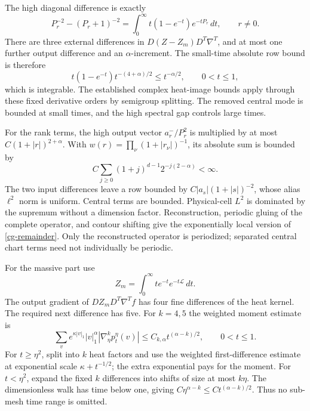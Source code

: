 The high diagonal difference is exactly
\begin{equation}\label{cg-high-remainder}
 P_r^{-2}-(P_r+1)^{-2}
 =\int_0^\infty t(1-e^{-t})e^{-tP_r}\,dt,
 \qquad r\ne0.
\end{equation}
There are three external differences in
$D(Z-Z_m)D^T\nabla^T$, and at most one further output
difference and an $\alpha$-increment. The small-time absolute
row bound is therefore
\begin{equation}\label{cg-time-budget}
 t(1-e^{-t})t^{-(4+\alpha)/2}\le t^{-\alpha/2},
 \qquad 0<t\le1,
\end{equation}
which is integrable. The established complex heat-image bounds
apply through these fixed derivative orders by semigroup
splitting. The removed central mode is bounded at small times,
and the high spectral gap controls large times.

For the rank terms, the high output vector $a_r^-/P_r^2$ is
multiplied by at most $C(1+|r|)^{2+\alpha}$.
With $w(r)=\prod_\nu(1+|r_\nu|)^{-1}$, its absolute sum is
bounded by
\[
 C\sum_{j\ge0}(1+j)^{d-1}2^{-j(2-\alpha)}<\infty.
\]
The two input differences leave a row bounded by
$C|a_s|(1+|s|)^{-2}$, whose alias $\ell^2$ norm is uniform.
Central terms are bounded. Physical-cell $L^2$ is dominated by
the supremum without a dimension factor. Reconstruction, periodic
gluing of the complete operator, and contour shifting give the
exponentially local version of \eqref{cg-remainder}.
Only the reconstructed operator is periodized; separated central
chart terms need not individually be periodic.

For the massive part use
\begin{equation}\label{cg-massive-heat}
 Z_m=\int_0^\infty t e^{-t}e^{-t\mathcal L}\,dt.
\end{equation}
The output gradient of $DZ_mD^T\nabla^Tf$ has four fine
differences of the heat kernel. The required next difference
has five. For $k=4,5$ the weighted moment estimate is
\begin{equation}\label{cg-moments}
 \sum_v e^{\kappa|v|_1}|v|_1^\alpha
       |\nabla_\eta^k p_t^\eta(v)|
       \le C_{k,\alpha}t^{(\alpha-k)/2},
       \qquad 0<t\le1.
\end{equation}
For $t\ge\eta^2$, split into $k$ heat factors and use the
weighted first-difference estimate at exponential scale
$\kappa+t^{-1/2}$; the extra exponential pays for the moment.
For $t<\eta^2$, expand the fixed $k$ differences into shifts of
size at most $k\eta$. The dimensionless walk has time below one,
giving $C\eta^{\alpha-k}\le Ct^{(\alpha-k)/2}$.
Thus no sub-mesh time range is omitted.

